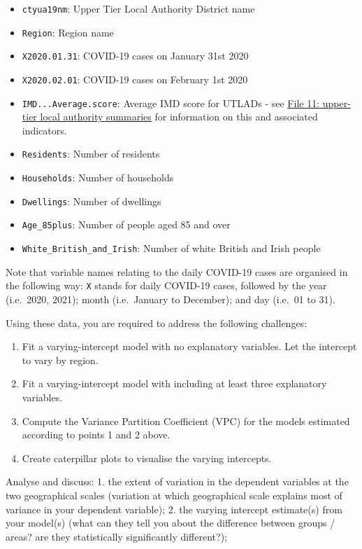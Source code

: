 \documentclass[
  letterpaper,
  DIV=11,
  numbers=noendperiod,
  oneside]{scrreprt}
\providecommand{\tightlist}{%
  \setlength{\itemsep}{0pt}\setlength{\parskip}{0pt}}\usepackage{longtable,booktabs,array}
\begin{document}
\begin{itemize}
\tightlist
\item
  \texttt{ctyua19nm}: Upper Tier Local Authority District name
\item
  \texttt{Region}: Region name
\item
  \texttt{X2020.01.31}: COVID-19 cases on January 31st 2020
\item
  \texttt{X2020.02.01}: COVID-19 cases on February 1st 2020
\item
  \texttt{IMD...Average.score}: Average IMD score for UTLADs - see
  \href{https://www.gov.uk/government/statistics/english-indices-of-deprivation-2019}{File
  11: upper-tier local authority summaries} for information on this and
  associated indicators.
\item
  \texttt{Residents}: Number of residents
\item
  \texttt{Households}: Number of households
\item
  \texttt{Dwellings}: Number of dwellings
\item
  \texttt{Age\_85plus}: Number of people aged 85 and over
\item
  \texttt{White\_British\_and\_Irish}: Number of white British and Irish
  people
\end{itemize}

Note that variable names relating to the daily COVID-19 cases are
organised in the following way: \texttt{X} stands for daily COVID-19
cases, followed by the year (i.e.~2020, 2021); month (i.e.~January to
December); and day (i.e.~01 to 31).

Using these data, you are required to address the following challenges:

\begin{enumerate}
\def\labelenumi{\arabic{enumi}.}
\item
  Fit a varying-intercept model with no explanatory variables. Let the
  intercept to vary by region.
\item
  Fit a varying-intercept model with including at least three
  explanatory variables.
\item
  Compute the Variance Partition Coefficient (VPC) for the models
  estimated according to points 1 and 2 above.
\item
  Create caterpillar plots to visualise the varying intercepts.
\end{enumerate}

Analyse and discuss: 1. the extent of variation in the dependent
variables at the two geographical scales (variation at which
geographical scale explains most of variance in your dependent
variable); 2. the varying intercept estimate(s) from your model(s) (what
can they tell you about the difference between groups / areas? are they
statistically significantly different?);
\end{document}
